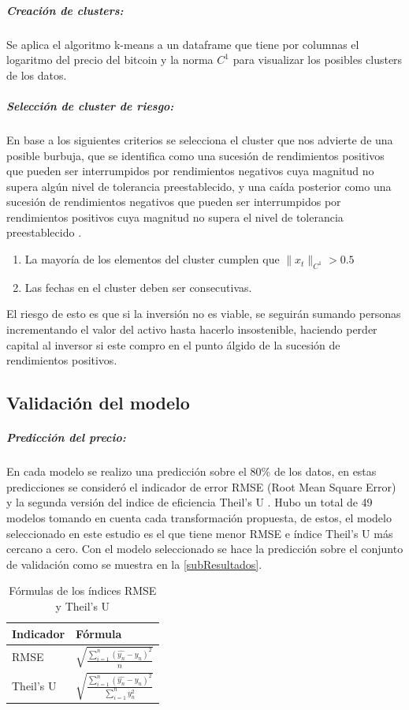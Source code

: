 \subparagraph{Creación de clusters:} Se aplica el algoritmo k-means a un dataframe que tiene por columnas el logaritmo del precio del bitcoin y la norma $C^1$ para visualizar los posibles clusters de los datos.
\subparagraph{Selección de cluster de riesgo:} En base a los siguientes criterios se selecciona el cluster que nos advierte de una posible burbuja, que se identifica como una sucesión de rendimientos positivos que pueden ser interrumpidos por rendimientos negativos cuya magnitud no supera algún nivel de tolerancia preestablecido, y una caída posterior como una sucesión de rendimientos negativos que pueden ser interrumpidos por rendimientos positivos cuya magnitud no supera el nivel de tolerancia preestablecido \cite{gideaTopologicalRecognitionCritical2020}. 

\begin{enumerate}
	\item La mayoría de los elementos del cluster cumplen que $\lVert x_t \rVert_{C^1} > 0.5$
	\item Las fechas en el cluster deben ser consecutivas.
\end{enumerate}

El riesgo de esto es que si la inversión no es viable, se seguirán sumando personas incrementando el valor del activo hasta hacerlo insostenible, haciendo perder capital al inversor si este compro en el punto álgido de la sucesión de rendimientos positivos.

\subsection{Validación del modelo}
\subparagraph{Predicción del precio:}
En cada modelo se realizo una predicción sobre el 80\% de los datos, en estas predicciones se consideró el indicador de error RMSE (Root Mean Square Error) y la segunda versión del indice de eficiencia Theil’s U \cite{bliemelTheilForecastAccuracy1973}.
Hubo un total de 49 modelos tomando en cuenta cada transformación propuesta, de estos, el modelo seleccionado en este estudio es el que tiene menor RMSE e índice Theil’s U más cercano a cero. Con el modelo seleccionado se hace la predicción sobre el conjunto de validación como se muestra en la \autoref{subResultados}.

\begin{table}[H]
	\centering
	{
		\begin{tabular}{ll}
			\toprule
			\textbf{Indicador} & \textbf{Fórmula}\\
			\midrule
			RMSE			&$\sqrt{\frac{\sum_{i=1}^{n}({\hat{y_{n}}} - y_{n})^{2}}{n}}$\\ 
			Theil’s U 	&$\sqrt{\frac{\sum_{i=1}^{n}({\hat{y_{n}}} - y_{n})^{2}}{\sum_{i=1}^{n}y_{n}^{2}}}$ \\
			
			\bottomrule
			\hline
	\end{tabular}} \quad
	\caption{Fórmulas de los índices RMSE y Theil’s U}
	\label{tab:Table12}
\end{table}

